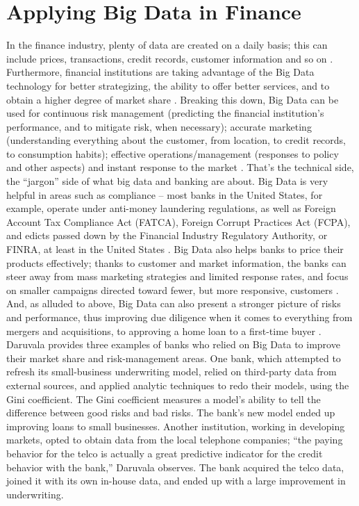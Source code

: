\documentclass[sigconf]{acmart}
\begin{document}
\section{Applying Big Data in Finance}

In the finance industry, plenty of data are created on a daily basis; this can include prices, transactions, credit records, customer information and so on \cite{peat2013}. Furthermore, financial institutions are taking advantage of the Big Data technology for better strategizing, the ability to offer better services, and to obtain a higher degree of market share \cite{peat2013}. Breaking this down, Big Data can be used for continuous risk management (predicting the financial institution’s performance, and to mitigate risk, when necessary); accurate marketing (understanding everything about the customer, from location, to credit records, to consumption habits); effective operations/management (responses to policy and other aspects) and instant response to the market \cite{peat2013}.
That’s the technical side, the “jargon” side of what big data and banking are about. Big Data is very helpful in areas such as compliance – most banks in the United States, for example,  operate under anti-money laundering regulations, as well as Foreign Account Tax Compliance Act (FATCA), Foreign Corrupt Practices Act (FCPA), and edicts passed down by the Financial Industry Regulatory Authority, or FINRA, at least in the United States \cite{gabor2017digital}. 
Big Data also helps banks to price their products effectively; thanks to customer and market information, the banks can steer away from mass marketing strategies and limited response rates, and focus on smaller campaigns directed toward fewer, but more responsive, customers \cite{gabor2017digital}. And, as alluded to above, Big Data can also present a stronger picture of risks and performance, thus improving due diligence when it comes to everything from mergers and acquisitions, to approving a home loan to a first-time buyer \cite{gabor2017digital}.
Daruvala provides three examples of banks who relied on Big Data to improve their market share and risk-management areas.
One bank, which attempted to refresh its small-business underwriting model, relied on third-party data from external sources, and applied analytic techniques to redo their models, using the Gini coefficient. The Gini coefficient measures a model’s ability to tell the difference between good risks and bad risks. The bank’s new model ended up improving loans to small businesses.
Another institution, working in developing markets, opted to obtain data from the local telephone companies; “the paying behavior for the telco is actually a great predictive indicator for the credit behavior with the bank,” Daruvala observes. The bank acquired the telco data, joined it with its own in-house data, and ended up with a large improvement in underwriting.
\end{document}
